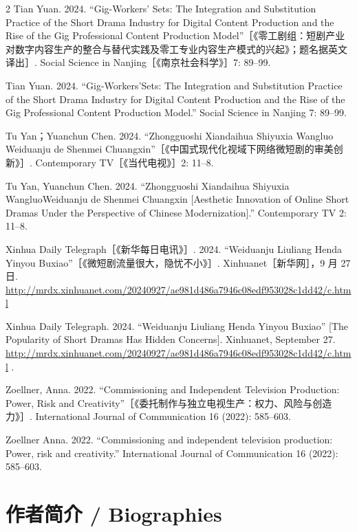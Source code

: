 \documentclass[10pt,a4paper]{article}
\begin{document}
\begin{paracol}{2}
\switchcolumn*
Tian Yuan. 2024. “Gig-Workers’ Sets: The Integration and Substitution Practice of the Short Drama Industry for Digital Content Production and the Rise of the Gig Professional Content Production Model”［《零工剧组：短剧产业对数字内容生产的整合与替代实践及零工专业内容生产模式的兴起》；题名据英文译出］. Social Science in Nanjing［《南京社会科学》］7: 89–99.\par
\switchcolumn
Tian Yuan. 2024. “Gig-Workers’Sets: The Integration and Substitution Practice of the Short Drama Industry for Digital Content Production and the Rise of the Gig Professional Content Production Model.” Social Science in Nanjing 7: 89–99.\par
\switchcolumn*
Tu Yan；Yuanchun Chen. 2024. “Zhongguoshi Xiandaihua Shiyuxia Wangluo Weiduanju de Shenmei Chuangxin”［《中国式现代化视域下网络微短剧的审美创新》］. Contemporary TV［《当代电视》］2: 11–8.\par
\switchcolumn
Tu Yan, Yuanchun Chen. 2024. “Zhongguoshi Xiandaihua Shiyuxia WangluoWeiduanju de Shenmei Chuangxin [Aesthetic Innovation of Online Short Dramas Under the Perspective of Chinese Modernization].” Contemporary TV 2: 11–8.\par
\switchcolumn*
Xinhua Daily Telegraph［《新华每日电讯》］. 2024. “Weiduanju Liuliang Henda Yinyou Buxiao”［《微短剧流量很大，隐忧不小》］. Xinhuanet［新华网］，9 月 27 日. \url{http://mrdx.xinhuanet.com/20240927/ae981d486a7946c08edf953028c1dd42/c.html}\par
\switchcolumn
Xinhua Daily Telegraph. 2024. “Weiduanju Liuliang Henda Yinyou Buxiao” [The Popularity of Short Dramas Has Hidden Concerns]. Xinhuanet, September 27. \url{http://mrdx.xinhuanet.com/20240927/ae981d486a7946c08edf953028c1dd42/c.html} .\par
\switchcolumn*
Zoellner, Anna. 2022. “Commissioning and Independent Television Production: Power, Risk and Creativity”［《委托制作与独立电视生产：权力、风险与创造力》］. International Journal of Communication 16 (2022): 585–603.\par
\switchcolumn
Zoellner Anna. 2022. “Commissioning and independent television production: Power, risk and creativity.” International Journal of Communication 16 (2022): 585–603.\par
\switchcolumn*
\end{paracol}
\section*{作者简介 / Biographies}
\end{document}
